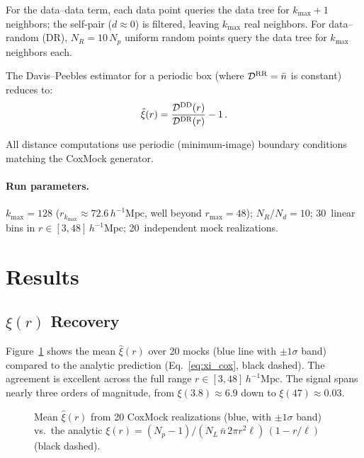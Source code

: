 \documentclass[11pt]{article}
\begin{document}
For the data--data term, each data point queries the data tree for
$k_{\max} + 1$ neighbors; the self-pair ($d \approx 0$) is filtered,
leaving $k_{\max}$ real neighbors.  For data--random (DR), $N_R =
10\,N_p$ uniform random points query the data tree for $k_{\max}$
neighbors each.

The Davis--Peebles estimator for a periodic box (where $\mathcal{D}^{\rm
RR} = \bar{n}$ is constant) reduces to:
\begin{equation}
  \hat\xi(r) = \frac{\mathcal{D}^{\rm DD}(r)}{\mathcal{D}^{\rm DR}(r)} - 1\,.
  \label{eq:dp_knn}
\end{equation}

All distance computations use periodic (minimum-image) boundary
conditions matching the CoxMock generator.

\paragraph{Run parameters.}
$k_{\max} = 128$ ($r_{k_{\max}} \approx 72.6\,h^{-1}\mathrm{Mpc}$,
well beyond $r_{\max} = 48$); $N_R/N_d = 10$; 30~linear bins in $r
\in [3, 48]\,h^{-1}\mathrm{Mpc}$; 20~independent mock realizations.

\section{Results}

\subsection{$\xi(r)$ Recovery}

Figure~\ref{fig:xi_comparison} shows the mean $\hat\xi(r)$ over 20
mocks (blue line with $\pm 1\sigma$ band) compared to the analytic
prediction (Eq.~\ref{eq:xi_cox}, black dashed).  The agreement is
excellent across the full range $r \in [3, 48]\,h^{-1}\mathrm{Mpc}$.
The signal spans nearly three orders of magnitude, from
$\xi(3.8) \approx 6.9$ down to $\xi(47) \approx 0.03$.

\begin{figure}[ht]
  \centering
  
  \caption{Mean $\hat\xi(r)$ from 20 CoxMock realizations (blue, with
  $\pm 1\sigma$ band) vs.\ the analytic
  $\xi(r) = (N_p{-}1)/(N_L\,\bar{n}\,2\pi r^2\ell)\,(1-r/\ell)$
  (black dashed).}
  \label{fig:xi_comparison}
\end{figure}
\end{document}

